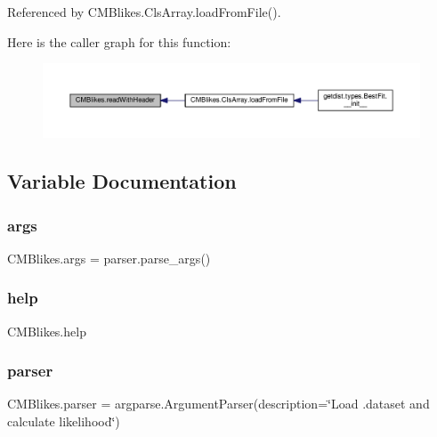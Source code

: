 Referenced by C\+M\+Blikes.\+Cls\+Array.\+load\+From\+File().

Here is the caller graph for this function\+:
\nopagebreak
\begin{figure}[H]
\begin{center}
\leavevmode
\includegraphics[width=350pt]{namespaceCMBlikes_a1466915350fd7dc3528979f6e8649244_icgraph}
\end{center}
\end{figure}


\subsection{Variable Documentation}
\mbox{\label{namespaceCMBlikes_a2f64c7f147e565478aa9fbfaac83d64f}} 
\subsubsection{\texorpdfstring{args}{args}}
{\footnotesize\ttfamily C\+M\+Blikes.\+args = parser.\+parse\+\_\+args()}

\mbox{\label{namespaceCMBlikes_aea6f0127434b3fad44cad7a616b7d78f}} 
\subsubsection{\texorpdfstring{help}{help}}
{\footnotesize\ttfamily C\+M\+Blikes.\+help}

\mbox{\label{namespaceCMBlikes_a0d371c3d532c4ee8265e18ca5c523bfc}} 
\subsubsection{\texorpdfstring{parser}{parser}}
{\footnotesize\ttfamily C\+M\+Blikes.\+parser = argparse.\+Argument\+Parser(description=\char`\"{}Load .dataset and calculate likelihood\char`\"{})}

